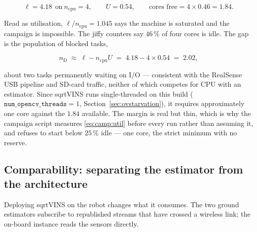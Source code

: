 \begin{equation}
  \ell = 4.18 \ \ \text{on}\ n_{\mathrm{cpu}}=4,
  \qquad
  U = 0.54,
  \qquad
  \text{cores free} = 4 \times 0.46 = 1.84 .
\end{equation}

Read as utilisation, $\ell/n_{\mathrm{cpu}} = 1.045$ says the machine is
saturated and the campaign is impossible. The jiffy counters say $46\,\%$ of
four cores is idle. The gap is the population of blocked tasks,

\begin{equation}
  n_{\mathrm{D}} \;\approx\; \ell - n_{\mathrm{cpu}} U
  \;=\; 4.18 - 4 \times 0.54 \;=\; 2.02 ,
\end{equation}

about two tasks permanently waiting on I/O --- consistent with the RealSense
USB pipeline and SD-card traffic, neither of which competes for CPU with an
estimator. Since sqrtVINS runs single-threaded on this build
($\texttt{num\_opencv\_threads}=1$, Section~\ref{sec:ovstarvation}), it
requires approximately one core against the $1.84$ available. The margin is
real but thin, which is why the campaign script measures
\eqref{eq:camp:util} before every run rather than assuming it, and refuses to
start below $25\,\%$ idle --- one core, the strict minimum with no reserve.

\subsection{Comparability: separating the estimator from the architecture}
\label{ssec:camp:comparabilite}

Deploying sqrtVINS on the robot changes what it consumes. The two ground
estimators subscribe to republished streams that have crossed a wireless link;
the on-board instance reads the sensors directly.

